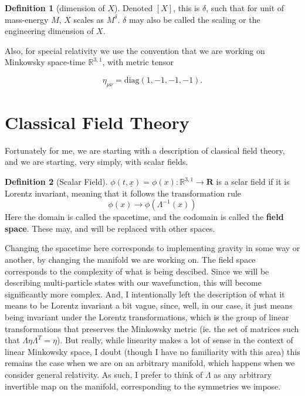 \documentclass{article}
\theoremstyle{definition}
\newtheorem{definition}{Definition}
\begin{document}
\begin{definition}[dimension of $X$]
  Denoted $[X]$, this is $\delta$, such that for unit of mass-energy $M$, $X$
  scales as $M^\delta$. $\delta$ may also be called the scaling or the
  engineering dimension of $X$.
\end{definition}

Also, for special relativity we use the convention that we are working on
Minkowsky space-time $\mathbb{R}^{3, 1}$, with metric tensor

$$ \eta_{\mu \nu} = \text{diag}(1, -1, -1, -1). $$

\section{Classical Field Theory}

Fortunately for me, we are starting with a description of classical field
theory, and we are starting, very simply, with scalar fields.

\begin{definition}[Scalar Field]
  $\phi(t, \underline{x}) = \phi(x) : \mathbb{R}^{3, 1} \to \mathbf{R}$ is a sclar field
  if it is Lorentz invariant, meaning that it follows the transformation rule
  $$ \phi(x) \to \phi(\Lambda^{-1}(x)) $$
  Here the domain is called the spacetime, and the codomain is called the
  \textbf{field space}. These may, and will be replaced with other spaces.
\end{definition}

Changing the spacetime here corresponds to implementing gravity in some way or
another, by changing the manifold we are working on. The field space corresponds
to the complexity of what is being descibed. Since we will be describing
multi-particle states with our wavefunction, this will become significantly more
complex. And, I intentionally left the description of what it means to be
Lorentz invariant a bit vague, since, well, in our case, it just means being
invariant under the Lorentz transformations, which is the group of
linear transformations that preserves the Minkowsky metric (ie. the set of
matrices such that $\Lambda \eta \Lambda^T = \eta$). But really, while linearity
makes a lot of sense in the context of linear Minkowsky space, I doubt (though I
have no familiarity with this area) this remains the case when we are on an
arbitrary manifold, which happens when we consider general relativity. As such,
I prefer to think of $\Lambda$ as any arbitrary invertible map on the manifold,
corresponding to the symmetries we impose. 
\end{document}
